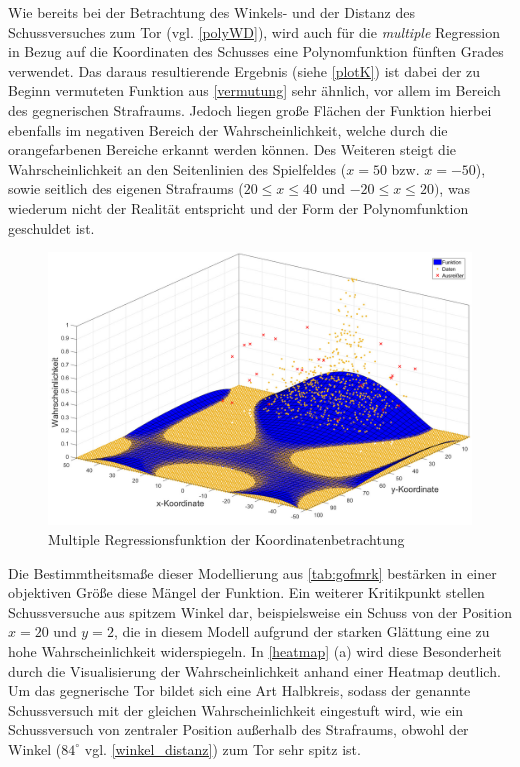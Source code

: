 Wie bereits bei der Betrachtung des Winkels- und der Distanz des Schussversuches zum Tor (vgl. \vref{polyWD}), wird auch für die \textit{multiple} Regression in Bezug auf die Koordinaten des Schusses eine Polynomfunktion fünften Grades verwendet. Das daraus resultierende Ergebnis (siehe \vref{plotK}) ist dabei der zu Beginn vermuteten Funktion aus \vref{vermutung} sehr ähnlich, vor allem im Bereich des gegnerischen Strafraums. Jedoch liegen große Flächen der Funktion hierbei ebenfalls im negativen Bereich der Wahrscheinlichkeit, welche durch die orangefarbenen Bereiche erkannt werden können. Des Weiteren steigt die Wahrscheinlichkeit an den Seitenlinien des Spielfeldes ($x=50$ bzw. $x=-50$), sowie seitlich des eigenen Strafraums ($20 \le x \le 40$ und $-20 \le x \le 20)$, was wiederum nicht der Realität entspricht und der Form der Polynomfunktion geschuldet ist.

\begin{figure}[H]
\centering
\includegraphics[scale=0.34]{se-wa-jpg/plotK}
\caption{Multiple Regressionsfunktion der Koordinatenbetrachtung}
\label{plotK}
\end{figure}

Die Bestimmtheitsmaße dieser Modellierung aus \vref{tab:gofmrk} bestärken in einer objektiven Größe diese Mängel der Funktion. Ein weiterer Kritikpunkt stellen Schussversuche aus spitzem Winkel dar, beispielsweise ein Schuss von der Position $x=20$ und $y=2$, die in diesem Modell aufgrund der starken Glättung eine zu hohe Wahrscheinlichkeit widerspiegeln. In \vref{heatmap} (a) wird diese Besonderheit durch die Visualisierung der Wahrscheinlichkeit anhand einer Heatmap deutlich. Um das gegnerische Tor bildet sich eine Art Halbkreis, sodass der genannte Schussversuch mit der gleichen Wahrscheinlichkeit eingestuft wird, wie ein Schussversuch von zentraler Position außerhalb des Strafraums, obwohl der Winkel ($84^\circ$ vgl. \vref{winkel_distanz}) zum Tor sehr spitz ist.

